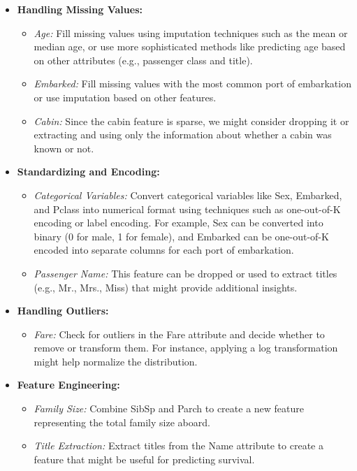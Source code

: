 \documentclass[twoside,11pt]{article}
\begin{document}
\begin{itemize}
    \item \textbf{Handling Missing Values:}
    \begin{itemize}
        \item \textit{Age:} Fill missing values using imputation techniques such as the mean or median age, or use more sophisticated methods like predicting age based on other attributes (e.g., passenger class and title).
        \item \textit{Embarked:} Fill missing values with the most common port of embarkation or use imputation based on other features.
        \item \textit{Cabin:} Since the cabin feature is sparse, we might consider dropping it or extracting and using only the information about whether a cabin was known or not.
    \end{itemize}
    \item \textbf{Standardizing and Encoding:}
    \begin{itemize}
        \item \textit{Categorical Variables:} Convert categorical variables like Sex, Embarked, and Pclass into numerical format using techniques such as one-out-of-K encoding or label encoding. For example, Sex can be converted into binary (0 for male, 1 for female), and Embarked can be one-out-of-K encoded into separate columns for each port of embarkation.
        \item \textit{Passenger Name:} This feature can be dropped or used to extract titles (e.g., Mr., Mrs., Miss) that might provide additional insights.
    \end{itemize}
    \item \textbf{Handling Outliers:}
    \begin{itemize}
        \item \textit{Fare:} Check for outliers in the Fare attribute and decide whether to remove or transform them. For instance, applying a log transformation might help normalize the distribution.
    \end{itemize}
    \item \textbf{Feature Engineering:}
    \begin{itemize}
        \item \textit{Family Size:} Combine SibSp and Parch to create a new feature representing the total family size aboard.
        \item \textit{Title Extraction:} Extract titles from the Name attribute to create a feature that might be useful for predicting survival.

\end{itemize}
\end{itemize}
\end{document}
